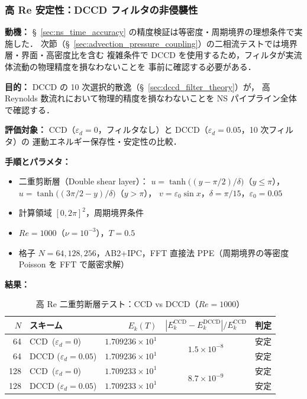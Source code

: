 %
\subsubsection{高 Re 安定性：DCCD フィルタの非侵襲性}
\label{sec:highre_dccd}

\noindent\textbf{動機：}
§~\ref{sec:ns_time_accuracy} の精度検証は等密度・周期境界の理想条件で実施した．
次節（§~\ref{sec:advection_pressure_coupling}）の二相流テストでは境界層・界面・高密度比を含む
複雑条件で DCCD を使用するため，フィルタが実流体流動の物理精度を損なわないことを
事前に確認する必要がある．

\noindent\textbf{目的：}
DCCD の 10 次選択的散逸（§~\ref{sec:dccd_filter_theory}）が，
高 Reynolds 数流れにおいて物理的精度を損なわないことを NS パイプライン全体で確認する．

\noindent\textbf{評価対象：}
CCD（$\varepsilon_d = 0$，フィルタなし）と
DCCD（$\varepsilon_d = 0.05$，10 次フィルタ）の
運動エネルギー保存性・安定性の比較．

\noindent\textbf{手順とパラメタ：}
\begin{itemize}[noitemsep]
  \item 二重剪断層（Double shear layer）：
        $u = \tanh\bigl((y - \pi/2)/\delta\bigr)$（$y \leq \pi$），
        $u = \tanh\bigl((3\pi/2 - y)/\delta\bigr)$（$y > \pi$），
        $v = \varepsilon_0\sin x$，$\delta = \pi/15$，$\varepsilon_0 = 0.05$
  \item 計算領域 $[0, 2\pi]^2$，周期境界条件
  \item $\mathit{Re} = 1000$（$\nu = 10^{-3}$），$T = 0.5$
  \item 格子 $N = 64, 128, 256$，AB2+IPC，FFT 直接法 PPE（周期境界の等密度 Poisson を FFT で厳密求解）
\end{itemize}

\noindent\textbf{結果：}

\begin{table}[htbp]
\centering
\caption{高 Re 二重剪断層テスト：CCD vs DCCD（$\mathit{Re} = 1000$）}
\label{tab:highre_dccd}
\renewcommand{\arraystretch}{1.3}
\begin{tabular}{rlrcl}
\toprule
$N$ & スキーム & $E_k(T)$ & $|E_k^{\text{CCD}} - E_k^{\text{DCCD}}| / E_k^{\text{CCD}}$ & 判定 \\
\midrule
  64 & CCD\, ($\varepsilon_d{=}0$)    & $1.709236 \times 10^{1}$ & \multirow{2}{*}{$1.5 \times 10^{-8}$} & 安定 \\
  64 & DCCD ($\varepsilon_d{=}0.05$) & $1.709236 \times 10^{1}$ &  & 安定 \\
\midrule
 128 & CCD\, ($\varepsilon_d{=}0$)    & $1.709233 \times 10^{1}$ & \multirow{2}{*}{$8.7 \times 10^{-9}$} & 安定 \\
 128 & DCCD ($\varepsilon_d{=}0.05$) & $1.709233 \times 10^{1}$ &  & 安定 \\
\bottomrule
\end{tabular}
\end{table}

